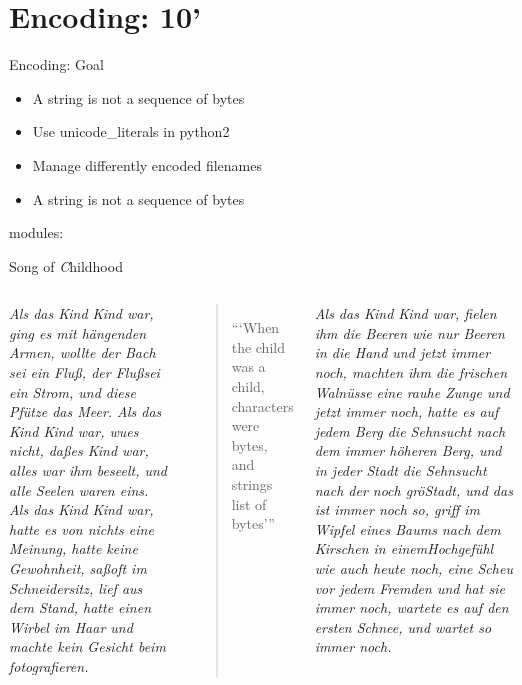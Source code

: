 \section{Encoding: 10'}

\begin{frame}[fragile]{Encoding: Goal}
\Large
\begin{itemize}
\item A string is not a sequence of bytes
\item Use unicode\_literals in python2
\item Manage differently encoded filenames 
\item A string is not a sequence of bytes
\end{itemize}
modules: 
\end{frame}


\begin{frame}{Song of \emph{C}hildhood}
\begin{columns}

\tiny
\textit{Als das Kind Kind war, ging es mit hängenden Armen, 
wollte der Bach sei ein Flu\ss, der Flu\ss sei ein Strom, 
und diese Pf\"utze das Meer.
\newline
Als das Kind Kind war,  wu\sste es nicht, da\ss es Kind war, 
alles war ihm beseelt, und alle Seelen waren eins.
\newline
Als das Kind Kind war, 
hatte es von nichts eine Meinung, 
hatte keine Gewohnheit, 
sa\ss oft im Schneidersitz, 
lief aus dem Stand, 
hatte einen Wirbel im Haar 
und machte kein Gesicht beim fotografieren.
}
\begin{verse}
\begin{center}
\Large
```When the child was a child,\\
\vspace{.5cm}
characters were bytes, and\\
\vspace{.5cm}
strings list of bytes'''
\end{center}
\end{verse}

\tiny \textit{Als das Kind Kind war, 
fielen ihm die Beeren wie nur Beeren in die Hand 
und jetzt immer noch, 
machten ihm die frischen Waln\"usse eine rauhe Zunge 
und jetzt immer noch, 
hatte es auf jedem Berg 
die Sehnsucht nach dem immer h\"oheren Berg, 
und in jeder Stadt 
die Sehnsucht nach der noch gr\"o\sseren Stadt, 
und das ist immer noch so, 
griff im Wipfel eines Baums nach dem Kirschen in einemHochgef\"uhl 
wie auch heute noch, 
eine Scheu vor jedem Fremden 
und hat sie immer noch, 
wartete es auf den ersten Schnee, 
und wartet so immer noch.
}
\end{columns}
\end{frame}


